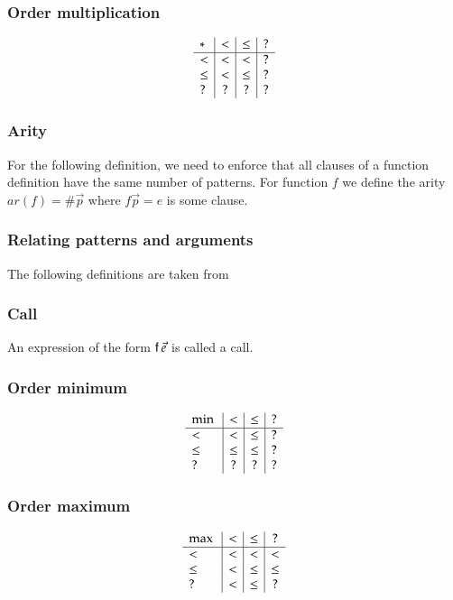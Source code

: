 \subsubsection{Order multiplication}
\[
\begin{array}{l | c |c | c}
 *   &  <  &  \leq & ? \\
\hline
  <   & <    & <    &   ? \\
 \leq & <    & \leq &   ?  \\
 ?    & ?    & ?    &   ?
\end{array}
\]


\subsubsection{Arity}
For the following definition, we need to enforce that all clauses of a function definition have the same number of patterns.
For function $f$ we define the arity $ar(f) = \# \vec{p} $ where $f \vec{p} = e $ is some clause.   

\subsubsection{Relating patterns and arguments}

The following definitions are taken from \cite{abelAltenkirch:predStRec}

\subsubsection{Call}
An expression of the form $\mathsf{f} \: \vec{e}$ is called a call.

\newcommand{\mino}{\opn{min}\:}
\newcommand{\maxo}{\opn{max}\:}
\newcommand{\supo}{\opn{sup}\:}
\newcommand{\info}{\opn{inf}\:}

\subsubsection{Order minimum}
\[
\begin{array}{l | c |c | c}
 \mino &  <      &  \leq    & ? \\
\hline
  <    & <       &  \leq    &   ? \\
 \leq  & \leq    &  \leq    &   ?  \\
 ?     & ?       &  ?       &   ?
\end{array}
\]

\subsubsection{Order maximum}
\[
\begin{array}{l | c |c | c}
 \maxo & <      &  \leq    &   ? \\
\hline
  <    & <       & <       &   <    \\
 \leq  & <       & \leq    &   \leq  \\
 ?     & <       & \leq    &   ?
\end{array}
\]

